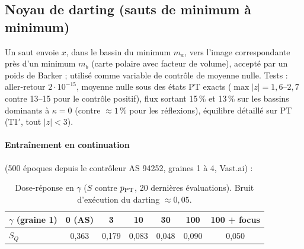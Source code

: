 \subsection{Noyau de darting (sauts de minimum à minimum)}
Un saut envoie $x$, dans le bassin du minimum $m_a$, vers l'image correspondante près d'un minimum $m_b$ (carte polaire avec facteur de volume), accepté par un poids de Barker ; utilisé comme variable de contrôle de moyenne nulle. Tests : aller-retour $2\cdot10^{-15}$, moyenne nulle sous des états PT exacts ($\max|z|=1{,}6$--$2{,}7$ contre 13--15 pour le contrôle positif), flux sortant 15\,\% et 13\,\% sur les bassins dominants à $\kappa=0$ (contre $\approx1\,\%$ pour les réflexions), équilibre détaillé sur PT (T1$'$, tout $|z|<3$).

\paragraph{Entraînement en continuation} (500 époques depuis le contrôleur AS 94252, graines 1 à 4, Vast.ai) :
\begin{table}[h]\centering\small
\begin{tabular}{lcccccc}\toprule
$\gamma$ (graine 1) & 0 (AS) & 3 & 10 & 30 & 100 & 100 + focus\\\midrule
$S_Q$ & 0,363 & 0,179 & 0,083 & 0,048 & 0,090 & 0,050\\\bottomrule
\end{tabular}
\caption{Dose-réponse en $\gamma$ ($S$ contre $p_{\rm PT}$, 20 dernières évaluations). Bruit d'exécution du darting $\approx0{,}05$.}
\end{table}

